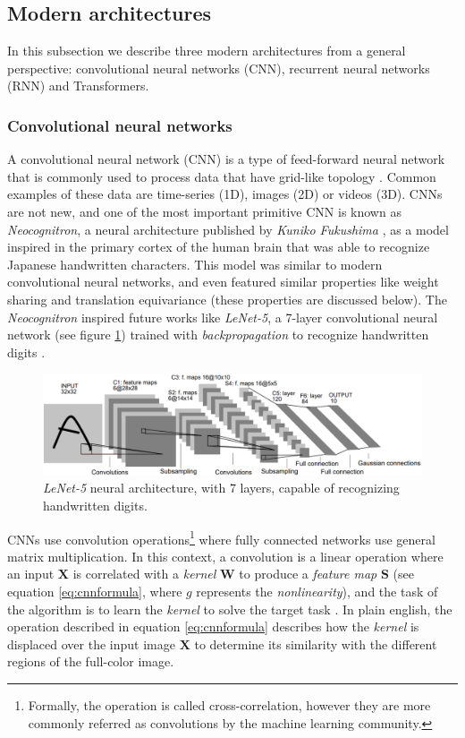 \subsection{Modern architectures}
In this subsection we describe three modern architectures from a general perspective: convolutional neural networks (CNN), recurrent neural networks (RNN) and Transformers.

\subsubsection{Convolutional neural networks}
A convolutional neural network (CNN) is a type of feed-forward neural network that is commonly used to process data that have grid-like topology \autocite{Goodfellow2016}. Common examples of these data are time-series (1D), images (2D) or videos (3D). CNNs are not new, and one of the most important primitive CNN is known as \textit{Neocognitron}, a neural architecture published by \textit{Kuniko Fukushima} \autocite{fukushima1980}, as a model inspired in the primary cortex of the human brain that was able to recognize Japanese handwritten characters. This model was similar to modern convolutional neural networks, and even featured similar properties like weight sharing and translation equivariance (these properties are discussed below). The \textit{Neocognitron} inspired future works like \textit{LeNet-5}, a 7-layer convolutional neural network (see figure \ref{fig:lenet5}) trained with \textit{backpropagation} to recognize handwritten digits \autocite{lecun1998}.

\begin{figure}
	\centering
	\includegraphics[width=0.7\linewidth]{chapter2/images/lenet5}
	\caption{\textit{LeNet-5} neural architecture, with 7 layers, capable of recognizing handwritten digits.}
	\label{fig:lenet5}
\end{figure}

CNNs use convolution operations\footnote{Formally, the operation is called cross-correlation, however they are more commonly referred as convolutions by the machine learning community.} where fully connected networks use general matrix multiplication. In this context, a convolution is a linear operation where an input $\mathbf{X}$ is correlated with a \textit{kernel} $\mathbf{W}$ to produce a \textit{feature map} $\mathbf{S}$ (see equation \ref{eq:cnnformula}, where $g$ represents the \textit{nonlinearity}), and the task of the algorithm is to learn the \textit{kernel} to solve the target task \autocite{haykin1998}. In plain english, the operation described in equation \ref{eq:cnnformula} describes how the \textit{kernel} is displaced over the input image $\mathbf{X}$ to determine its similarity with the different regions of the full-color image.

